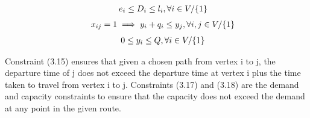\begin{equation}
    \begin{array}{ll@{}ll@{}ll}
        & e_{i} \leq D_{i} \leq l_{i}, \forall i \in V / \{1\}
    \end{array}
\end{equation}
\begin{equation}
    \begin{array}{ll@{}ll@{}ll}
        & x_{ij} = 1 \implies y_{i} + q_{i} \leq y_{j}, \forall i, j \in V / \{1\}
    \end{array}
\end{equation}
\begin{equation}
    \begin{array}{ll@{}ll@{}ll}
        & 0 \leq y_{i} \leq Q, \forall i \in V / \{1\}
    \end{array}
\end{equation}

\vspace{1cm}

Constraint (3.15) ensures that given a chosen path from vertex i to j, the departure time of j does not exceed the
departure time at vertex i plus the time taken to travel from vertex i to j. Constraints (3.17) and (3.18) are the
demand and capacity constraints to ensure that the capacity does not exceed the demand at any point in the given route.

